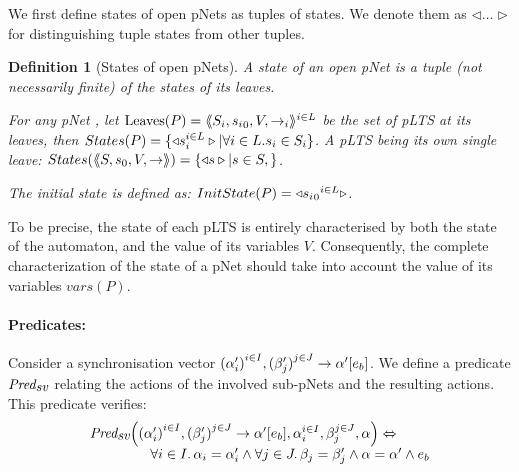 \documentclass{lmcs}
\newcommand{\LUDO}[1]{\textcolor{darkgreen}{#1}}
\newtheorem{definition}{Definition}
\newtheorem{example}{Example}
\begin{document}
We first define states of open pNets as tuples of states. We denote them
 as $\triangleleft\ldots\triangleright$ for distinguishing tuple 
states from other tuples.
\begin{definition}[States of open pNets]\label{def-states}
  A state of an open pNet is a tuple (not necessarily finite) of the
  states of its leaves.

  For any pNet \pNet, let $\operatorname{Leaves}(P) = \langle\hspace{-0.58ex}\langle S_i,{s_i}_0,V, \to_i\rangle\hspace{-0.58ex}\rangle^{i \in L}$ be 
  the set of pLTS at its leaves,
  then $States(P) = \{\triangleleft s_i^{i\in L}
  \triangleright| \forall i\in L. s_i \in S_i\}$.
A pLTS being its own single leave:
  $States(\langle\hspace{-0.58ex}\langle S,s_0,V, \to\rangle\hspace{-0.58ex}\rangle) = \{\triangleleft s \triangleright| s \in S, \}$.  

The initial state is defined as:
$InitState(P) = \triangleleft {{s_i}_0}^{i\in L}  \triangleright$.
\end{definition}
To be precise, the state of each pLTS is entirely characterised by both the state of the automaton, and the value of its variables $V$. Consequently, the complete characterization of the state of a pNet should take into account the value of its variables $vars(P)$.



\paragraph{Predicates:}
Consider a synchronisation vector ${(\alpha'_i)}^{i\in I}, {(\beta'_j)}^{j\in J}\to \alpha' [e_b]$. We 
define a
predicate $\Predsv$ relating
the actions of the involved sub-pNets and the resulting actions. This predicate verifies:
\[\begin{array}{l}\Predsv \Big(\SV{{(\alpha'_i)}^{i\in I}, {(\beta'_j)}^{j\in J}} 
{\alpha'} 
{e_b}, \alpha_i^{i\in I}, \beta_j^{j\in J}, \alpha\Big)\Leftrightarrow \\~\qquad\qquad%
%
\forall i\in I.\, \alpha_i=\alpha'_i\land \forall j \in J.\, \beta_j=\beta'_j \land 
\alpha=\alpha' 
\land e_b
\end{array} 
\]
\end{document}
